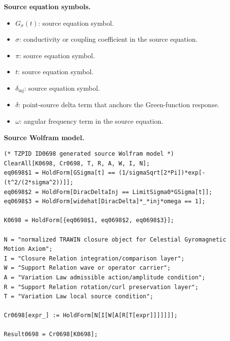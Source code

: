 \begin{minipage}[t]{0.49\linewidth}
\begingroup
\small
\raggedright
\textbf{Source equation symbols.}\par
\begin{itemize}[leftmargin=1.35em,itemsep=1pt,topsep=1pt,parsep=0pt]
    \item $G_{\sigma}(t)$: source equation symbol.
    \item $\sigma$: conductivity or coupling coefficient in the source equation.
    \item $\pi$: source equation symbol.
    \item $t$: source equation symbol.
    \item $\delta_{\mathrm{inj}}$: source equation symbol.
    \item $\delta$: point-source delta term that anchors the Green-function response.
    \item $\omega$: angular frequency term in the source equation.
\end{itemize}
\endgroup
\end{minipage}\hfill
\begin{minipage}[t]{0.47\linewidth}
\begingroup
\scriptsize
\raggedright
\textbf{Source Wolfram model.}\par
\begin{Verbatim}[fontsize=\tiny,breaklines=true,breakanywhere=true]
(* TZPID ID0698 generated source Wolfram model *)
ClearAll[K0698, Cr0698, T, R, A, W, I, N];
eq0698$1 = HoldForm[GSigma[t] == (1/sigmaSqrt[2*Pi])*exp[-(t^2/(2*sigma^2))]];
eq0698$2 = HoldForm[DiracDeltaInj == LimitSigma0*GSigma[t]];
eq0698$3 = HoldForm[widehat[DiracDelta]*_*inj*omega == 1];

K0698 = HoldForm[{eq0698$1, eq0698$2, eq0698$3}];

N = "normalized TRAWIN closure object for Celestial Gyromagnetic Motion Axiom";
I = "Closure Relation integration/comparison layer";
W = "Support Relation wave or operator carrier";
A = "Variation Law admissible action/amplitude condition";
R = "Support Relation rotation/curl preservation layer";
T = "Variation Law local source condition";

Cr0698[expr_] := HoldForm[N[I[W[A[R[T[expr]]]]]]];

Result0698 = Cr0698[K0698];
\end{Verbatim}
\endgroup
\end{minipage}

